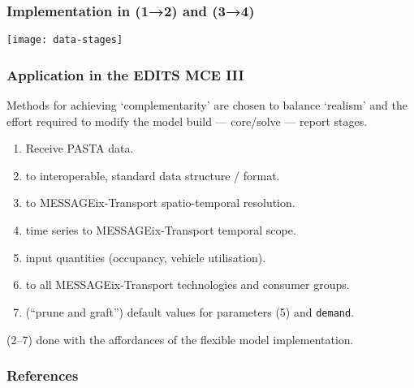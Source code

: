 \documentclass[12pt,aspectratio=169]{beamer}
\begin{document}
\begin{frame}
\frametitle{Implementation in (1→2) and (3→4)}
\texttt{[image: data-stages]}
\end{frame}

\begin{frame}
\frametitle{Application in the EDITS MCE III}

Methods for achieving ‘complementarity’ are chosen to balance ‘realism’ and the effort required to modify the model build — core/solve — report stages.

\medskip
\begin{enumerate}
  \item Receive PASTA data.
  \item {} to interoperable, standard data structure / format.
  \item {} to MESSAGEix-Transport spatio-temporal resolution.
  \item {} time series to MESSAGEix-Transport temporal scope.
  \item {} input quantities (occupancy, vehicle utilisation).
  \item {} to all MESSAGEix-Transport technologies and consumer groups.
  \item {} (“prune and graft”) default values for parameters (5) and \texttt{demand}.
\end{enumerate}

\medskip
(2–7) done with the affordances of the flexible model implementation.
\end{frame}

\makefinalslide

\appendix

\begin{frame}[allowframebreaks]
\frametitle{References}

\printbibliography[heading=none]

\end{frame}
\end{document}
